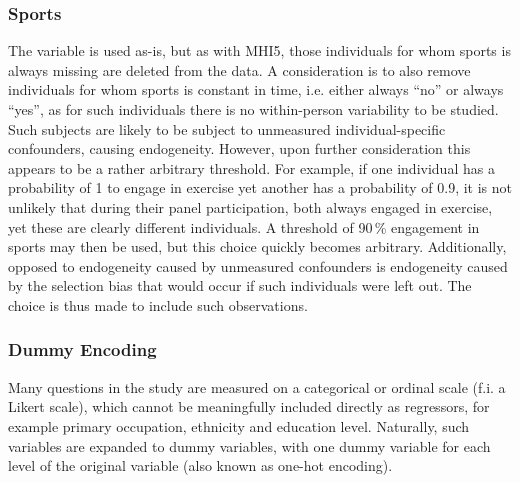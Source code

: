 \subsubsection{Sports}
The variable is used as-is, but as with MHI5, those individuals for whom sports is always missing are deleted from the data.
A consideration is to also remove individuals for whom sports is constant in time, i.e. either always ``no'' or always ``yes'',
as for such individuals there is no within-person variability to be studied. Such subjects are likely to be subject
to unmeasured individual-specific confounders, causing endogeneity.
However, upon further consideration this appears to be a rather arbitrary threshold. For example, if one individual has a
probability of 1 to engage in exercise yet another has a probability of 0.9, it is not unlikely that during their
panel participation, both always engaged in exercise, yet these are clearly different individuals.
A threshold of 90\,\% engagement in sports may then be used, but this choice quickly becomes arbitrary.
Additionally, opposed to endogeneity caused by unmeasured confounders is endogeneity caused by the selection bias
that would occur if such individuals were left out.
The choice is thus made to include such observations.

\subsubsection{Dummy Encoding}
Many questions in the study are measured on a categorical or ordinal scale (f.i. a Likert scale), which cannot be
meaningfully included directly as regressors, for example primary occupation, ethnicity and education level.
Naturally, such variables are expanded to dummy variables, with one dummy variable for each level of the original variable
(also known as one-hot encoding).

